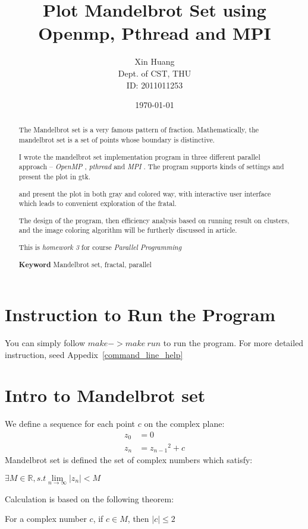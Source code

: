 \documentclass{article}
\title{Plot Mandelbrot Set using Openmp, Pthread and MPI}
\author{Xin Huang\\ Dept. of CST, THU\\ ID: 2011011253}
\date{\today}
\newcommand{\centerize}[1]{\begin{center} #1 \end{center}}
\newcommand{\pthread} { {\it pthread} }
\newcommand{\openmp} { {\it OpenMP} }
\newcommand{\mpi} { {\it MPI} }
\begin{document}
\maketitle

\begin{abstract}

	The Mandelbrot set is a very famous pattern of fraction. Mathematically,
	the mandelbrot set is a set of points whose boundary is distinctive.

	I wrote the mandelbrot set implementation program in three different parallel
	approach -- \openmp, \pthread and \mpi. The program supports kinds of settings
	and present the plot in gtk.

	and present the plot in both gray and colored way, with interactive user
	interface which leads to convenient exploration of the fratal.

	The design of the program,
	then efficiency analysis based on running result
	on clusters, and the image coloring algorithm
	will be furtherly discussed in article.

	This is {\it homework 3} for course {\it Parallel Programming}

	{\bf Keyword} Mandelbrot set, fractal, parallel
\end{abstract}

\tableofcontents

\clearpage

\section{Instruction to Run the Program}
	You can simply follow $make->make~run$ to run the program. For more
	detailed instruction, seed Appedix~\ref{command_line_help}
\section{Intro to Mandelbrot set}
	We define a sequence for each point $c$ on the complex plane:
			\begin{align}
				z_0 & = 0 \\
				z_n & ={z_{n-1}}^2 + c
			\end{align}
	Mandelbrot set is defined the set of complex numbers which satisfy:
	\centerize{$\exists M \in \mathbb{R}, s.t \lim\limits_{n \to \infty} |z_n| < M$}

	Calculation is based on the following theorem:
	\centerize{For a complex number $c$, if $c \in M$, then $|c| \le 2$}
\end{document}
